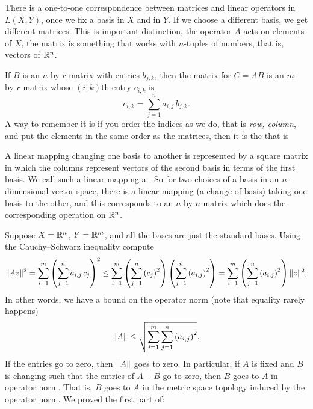 There is a one-to-one correspondence between matrices and linear operators in
$L(X,Y)$, once we fix a basis in $X$ and in $Y$.  If we 
choose a different basis, we get different matrices.  This is
important distinction, the operator $A$ acts on elements of $X$, the matrix
is something that works with $n$-tuples of numbers, that is, vectors of
${\mathbb{R}}^n$.

If $B$ is an $n$-by-$r$ matrix with entries $b_{j,k}$, then 
the matrix for $C = AB$ is an $m$-by-$r$ matrix whose $(i,k)$th entry
$c_{i,k}$ is
\begin{equation*}
c_{i,k} =
\sum_{j=1}^n a_{i,j}\,b_{j,k} .
\end{equation*}
A way to remember it is if you order the indices as we do, that is
\emph{row, column}, and put the elements in the same order as the matrices,
then it is the  that is 

A linear mapping changing one basis to another is represented by a
square matrix in which the columns represent vectors
of the second basis in terms of the first basis.  We call such a linear
mapping a \emph{}.  So for two choices of a
basis in an $n$-dimensional vector space, there is a linear mapping
(a change of basis)
taking one basis to the other, and this corresponds to an $n$-by-$n$
matrix which does the corresponding operation on ${\mathbb{R}}^n$.

\medskip

Suppose
$X={\mathbb{R}}^n$, $Y={\mathbb{R}}^m$, and
all the bases are just the standard bases.
Using the Cauchy--Schwarz inequality compute
\begin{equation*}
\lVert {Az} \rVert^2
=
\sum_{i=1}^m { \left(\sum_{j=1}^n a_{i,j} \, c_j \right)}^2
\leq
\sum_{i=1}^m { \left(\sum_{j=1}^n {(c_j)}^2 \right) \left(\sum_{j=1}^n
{(a_{i,j})}^2 \right) }
=
\sum_{i=1}^m \left(\sum_{j=1}^n {(a_{i,j})}^2 \right)
\lVert {z} \rVert^2 .
\end{equation*}
In other words, we have a bound on the operator norm (note that equality
rarely happens)
\begin{equation*}
\lVert {A} \rVert \leq
\sqrt{\sum_{i=1}^m \sum_{j=1}^n {(a_{i,j})}^2} .
\end{equation*}
If the entries go to zero, then $\lVert {A} \rVert$ goes to zero.  In
particular, if $A$ is fixed and $B$ is changing such
that the entries of $A-B$ go to zero, then $B$ goes to $A$
in operator norm.  That is, $B$ goes to $A$
in the metric space topology induced by the
operator norm.  We proved the first part of:

